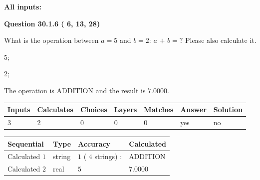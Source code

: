 \documentclass[12pt]{article}
\begin{document}
   
   
   
\noindent{}
   
   
   
   
\noindent\vspace{0.1in}\hspace{-0.08in} {\textbf{\Large{All inputs: }}}
   
   
  
\vspace{0.2in}
  
{\textbf{\Large{Question
30.1.6 
 (          6,         13,         28)
}}}
  
  
What is the operation between $a= %
5$ and $b= %
2$:
$a$  %
$+$ $b=?$ Please also calculate it.
 
 
\noindent{}
 
 

5;
 
2;
 
The operation is  %
ADDITION and the result is
$ %
7.0000$.
 
 
 
\noindent{}
 
 

 
\vspace{0.3in}
   
   
   
   
\noindent\begin{tabular}{|l|l|l|l|l|l|l|}
 \hline
Inputs & Calculates & Choices & Layers & Matches & Answer & Solution \\ \hline
           3 & 
           2 & 
           0
  & 
           0 & 
           0 & 
  yes & 
  no 
  \\ \hline
 \end{tabular}
   
   
   
   
\noindent{}
   
   
  
  
\noindent\begin{tabular}{|l|l|l|l|}
\hline
 Sequential & Type & Accuracy & Calculated \\ 
\hline
 
 
  Calculated $           1$ & string & $           1 $ ( $          4 $ strings)
 : 
 & ADDITION
 \\  \hline  
 
 
  Calculated $           2$ & real & $           5 $ & 
 $ 7.0000 $ 
 \\  \hline  
 \end{tabular}
   
\end{document}
